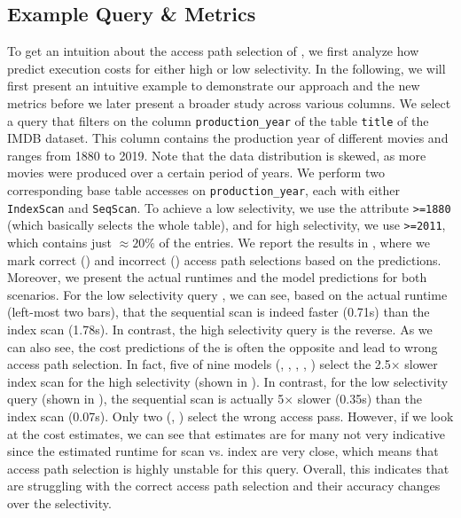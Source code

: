 \subsection{Example Query \& Metrics} \label{subsec:access_path_anecdotal}
To get an intuition about the access path selection of \lcms, we first analyze how \lcms predict execution costs for either high or low selectivity.
In the following, we will first present an intuitive example to demonstrate our approach and the new metrics before we later present a broader study across various columns.
We select a query that filters on the column \texttt{production\_year} of the table \texttt{title} of the IMDB dataset.
This column contains the production year of different movies and ranges from 1880 to 2019.
Note that the data distribution is skewed, as more movies were produced over a certain period of years.
We perform two corresponding base table accesses on \texttt{production\_year}, each with either \texttt{IndexScan} and \texttt{SeqScan}.
To achieve a low selectivity, we use the attribute \texttt{>=1880} (which basically selects the whole table), and for high selectivity, we use \texttt{>=2011}, which contains just $\approx 20\%$ of the entries.
We report the results in , where we mark correct (\checkmark) and incorrect () access path selections based on the \lcm predictions.
Moreover, we present the actual runtimes and the model predictions for both scenarios.
For the low selectivity query , we can see, based on the actual runtime (left-most two bars), that the sequential scan is indeed faster (0.71s) than the index scan (1.78s). 
In contrast, the high selectivity query  is the reverse.
As we can also see, the cost predictions of the \lcms is often the opposite and lead to wrong access path selection.
In fact, five of nine models (\flatvector, \mscn, \zeroshot, \queryformer, \qppnet) select the 2.5$\times$ slower index scan for the high selectivity (shown in ).
In contrast, for the low selectivity query (shown in ), the sequential scan is actually  5$\times$ slower (0.35s) than the index scan (0.07s).
Only two \lcms (\mscn, \dace) select the wrong access pass. 
However, if we look at the cost estimates, we can see that estimates are for many \lcms not very indicative since the estimated runtime for scan vs. index are very close, which means that access path selection is highly unstable for this query. 
Overall, this indicates that \lcms are struggling with the correct access path selection and their accuracy changes over the selectivity.

